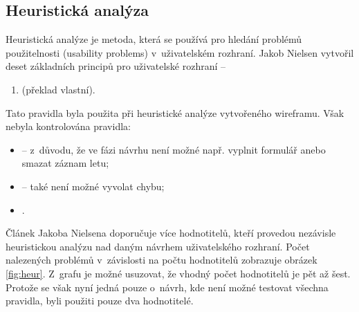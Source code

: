 \documentclass[thesis=M,czech]{FITthesis}[2012/06/26]
\begin{document}
\subsection{Heuristická analýza}
Heuristická analýze je metoda, která se používá pro hledání problémů použitelnosti (usability problems) v~uživatelském rozhraní. \cite{howtoheuristic} Jakob Nielsen vytvořil deset základních principů pro uživatelské rozhraní --
\begin{enumerate}
 \item {} \cite{10heuristics} (překlad vlastní).
\end{enumerate}

Tato pravidla byla použita při heuristické analýze vytvořeného wireframu. Však nebyla kontrolována pravidla:
\begin{itemize}
\item {} -- z~důvodu, že ve fázi návrhu není možné např. vyplnit formulář anebo smazat záznam letu;
\item {} -- také není možné vyvolat chybu;
\item {}.
\end{itemize}

Článek Jakoba Nielsena \cite{howtoheuristic} doporučuje více hodnotitelů, kteří provedou nezávisle heuristickou analýzu nad daným návrhem uživatelského rozhraní. Počet nalezených problémů v~závislosti na počtu hodnotitelů zobrazuje obrázek \ref{fig:heur}. Z~grafu je možné usuzovat, že vhodný počet hodnotitelů je pět až šest. Protože se však nyní jedná pouze o~návrh, kde není možné testovat všechna pravidla, byli použiti pouze dva hodnotitelé.
\end{document}
